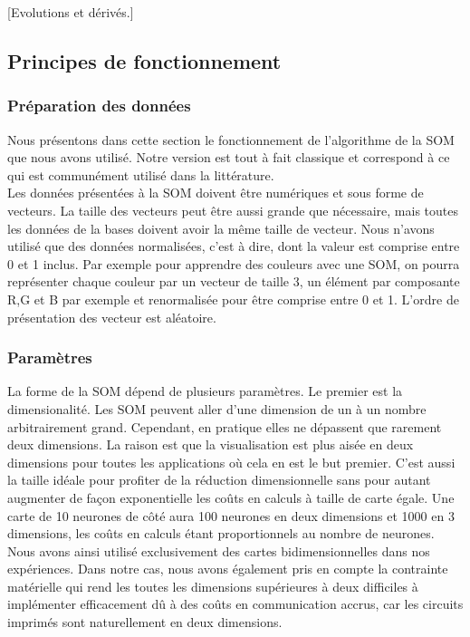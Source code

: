 	[Evolutions et dérivés.]

\subsection{Principes de fonctionnement}
\subsubsection{Préparation des données}

	Nous présentons dans cette section le fonctionnement de l'algorithme de la SOM que nous avons utilisé. Notre version est tout à fait classique et correspond à ce qui est communément utilisé dans la littérature.\\

	Les données présentées à la SOM doivent être numériques et sous forme de vecteurs. La taille des vecteurs peut être aussi grande que nécessaire, mais toutes les données de la bases doivent avoir la même taille de vecteur. Nous n'avons utilisé que des données normalisées, c'est à dire, dont la valeur est comprise entre 0 et 1 inclus. Par exemple pour apprendre des couleurs avec une SOM, on pourra représenter chaque couleur par un vecteur de taille 3, un élément par composante R,G et B par exemple et renormalisée pour être comprise entre 0 et 1. L'ordre de présentation des vecteur est aléatoire.

\subsubsection{Paramètres}\label{param_som}

	La forme de la SOM dépend de plusieurs paramètres. Le premier est la dimensionalité. Les SOM peuvent aller d'une dimension de un à un nombre arbitrairement grand. Cependant, en pratique elles ne dépassent que rarement deux dimensions. La raison est que la visualisation est plus aisée en deux dimensions pour toutes les applications où cela en est le but premier. C'est aussi la taille idéale pour profiter de la réduction dimensionnelle sans pour autant augmenter de façon exponentielle les coûts en calculs à taille de carte égale. Une carte de 10 neurones de côté aura 100 neurones en deux dimensions et 1000 en 3 dimensions, les coûts en calculs étant proportionnels au nombre de neurones. Nous avons ainsi utilisé exclusivement des cartes bidimensionnelles dans nos expériences. Dans notre cas, nous avons également pris en compte la contrainte matérielle qui rend les toutes les dimensions supérieures à deux difficiles à implémenter efficacement dû à des coûts en communication accrus, car les circuits imprimés sont naturellement en deux dimensions.
	
